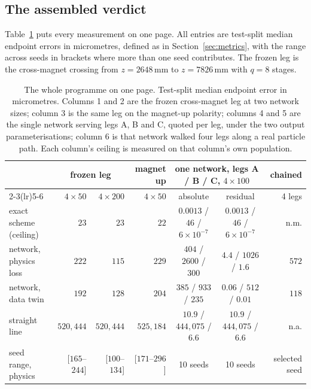 \documentclass[11pt,a4paper]{article}
\newcommand{\mm}{\ensuremath{\,\mathrm{mm}}}
\begin{document}
\subsection{The assembled verdict}
\label{sec:verdict}

Table~\ref{tab:verdict} puts every measurement on one page. All entries are
test-split median endpoint errors in micrometres, defined as in
Section~\ref{sec:metrics}, with the range across seeds in brackets where more
than one seed contributes. The frozen leg is the cross-magnet crossing from
$z = 2648\mm$ to $z = 7826\mm$ with $q = 8$ stages.

\begin{table}[tbp]
  \centering
  \caption{The whole programme on one page. Test-split median endpoint error in
  micrometres. Columns 1 and 2 are the frozen cross-magnet leg at two network
  sizes; column 3 is the same leg on the magnet-up polarity; columns 4 and
  5 are the single network serving legs A, B and C, quoted per leg, under the
  two output parameterisations; column 6 is that network walked four legs along
  a real particle path. Each column's ceiling is measured on that column's own
  population.}
  \label{tab:verdict}
  \scriptsize
  \setlength{\tabcolsep}{3pt}
  \begin{tabular}{lrrrccr}
    \toprule
    & \multicolumn{2}{c}{frozen leg} & magnet up
    & \multicolumn{2}{c}{one network, legs A / B / C, $4\times100$}
    & chained \\
    \cmidrule(lr){2-3}\cmidrule(lr){5-6}
    & $4\times50$ & $4\times200$ & $4\times50$
    & absolute & residual & 4 legs \\
    \midrule
    exact scheme (ceiling)
      & $23$ & $23$ & $22$
      & $0.0013$ / $46$ / $6\!\times\!10^{-7}$
      & $0.0013$ / $46$ / $6\!\times\!10^{-7}$
      & n.m. \\
    network, physics loss
      & $222$ & $115$ & $229$
      & $404$ / $2600$ / $300$
      & $4.4$ / $1026$ / $1.6$
      & $572$ \\
    network, data twin
      & $192$ & $128$ & $204$
      & $385$ / $933$ / $235$
      & $0.06$ / $512$ / $0.01$
      & $118$ \\
    straight line
      & $520{,}444$ & $520{,}444$ & $525{,}184$
      & $10.9$ / $444{,}075$ / $6.6$
      & $10.9$ / $444{,}075$ / $6.6$
      & n.a. \\
    \midrule
    seed range, physics
      & [$165$--$244$] & [$100$--$134$] & [$171$--$296$]
      & 10 seeds & 10 seeds & selected seed \\
    \bottomrule
  \end{tabular}
\end{table}
\end{document}
